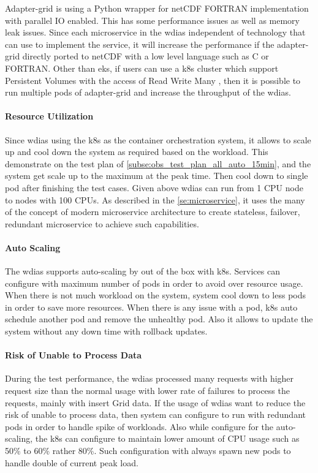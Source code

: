 \documentclass[conference]{IEEEtran}
\begin{document}
Adapter-grid is using a Python wrapper for netCDF FORTRAN implementation with parallel IO enabled. This has some performance issues as well as memory leak issues. Since each microservice in the \acrshort{wdias} independent of technology that can use to implement the service, it will increase the performance if the adapter-grid directly ported to netCDF with a low level language such as C or FORTRAN.
Other than \acrshort{eks}, if users can use a \acrshort{k8s} cluster which support Persistent Volumes with the access of Read Write  Many \cite{LinuxFoundationPersistentKubernetes} , then it is possible to run multiple pods of adapter-grid and increase the throughput of the \acrshort{wdias}.

\paragraph{Resource Utilization}
Since \acrshort{wdias} using the \acrshort{k8s} as the container orchestration system, it allows to scale up and cool down the system as required based on the workload. This demonstrate on the test plan of \cref{subse:obs_test_plan_all_auto_15min}, and the system get scale up to the maximum at the peak time. Then cool down to single pod after finishing the test cases.
Given above \acrshort{wdias} can run from 1 CPU node to nodes with 100 CPUs. As described in the \cref{se:microservice}, it uses the many of the concept of modern microservice architecture to create stateless, failover, redundant microservice to achieve such capabilities.

\paragraph{Auto Scaling}
The \acrshort{wdias} supports auto-scaling by out of the box with \acrshort{k8s}. Services can configure with maximum number of pods in order to avoid over resource usage. When there is not much workload on the system, system cool down to less pods in order to save more resources. When there is any issue with a pod, \acrshort{k8s} auto schedule another pod and remove the unhealthy pod. Also it allows to update the system without any down time with rollback updates.

\paragraph{Risk of Unable to Process Data}
During the test performance, the \acrshort{wdias} processed many requests with higher request size than the normal usage with lower rate of failures to process the requests, mainly with insert Grid data. If the usage of \acrshort{wdias} want to reduce the risk of unable to process data, then system can configure to run with redundant pods in order to handle spike of workloads. Also while configure for the auto-scaling, the \acrshort{k8s} can configure to maintain lower amount of CPU usage such as 50\% to 60\% rather 80\%. Such configuration with always spawn new pods to handle double of current peak load.
\end{document}
